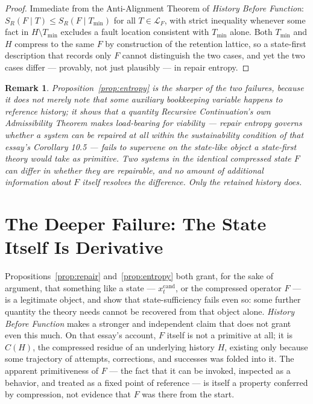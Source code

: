 \documentclass[11pt]{article}
\newtheorem*{remark}{Remark}
\begin{document}
\begin{proof}
Immediate from the Anti-Alignment Theorem of \emph{History Before Function}: $S_R(F\mid T)\leq S_R(F\mid T_{\min})$ for all $T\in\mathcal{L}_F$, with strict inequality whenever some fact in $H\setminus T_{\min}$ excludes a fault location consistent with $T_{\min}$ alone. Both $T_{\min}$ and $H$ compress to the same $F$ by construction of the retention lattice, so a state-first description that records only $F$ cannot distinguish the two cases, and yet the two cases differ — provably, not just plausibly — in repair entropy.
\end{proof}

\begin{remark}
Proposition~\ref{prop:entropy} is the sharper of the two failures, because it does not merely note that some auxiliary bookkeeping variable happens to reference history; it shows that a quantity \emph{Recursive Continuation}'s own Admissibility Theorem makes load-bearing for viability — repair entropy governs whether a system can be repaired at all within the sustainability condition of that essay's Corollary 10.5 — fails to supervene on the state-like object a state-first theory would take as primitive. Two systems in the identical compressed state $F$ can differ in whether they are repairable, and no amount of additional information about $F$ itself resolves the difference. Only the retained history does.
\end{remark}

\section{The Deeper Failure: The State Itself Is Derivative}

Propositions~\ref{prop:repair} and~\ref{prop:entropy} both grant, for the sake of argument, that something like a state — $x_t^{\mathrm{cand}}$, or the compressed operator $F$ — is a legitimate object, and show that state-sufficiency fails even so: some further quantity the theory needs cannot be recovered from that object alone. \emph{History Before Function} makes a stronger and independent claim that does not grant even this much. On that essay's account, $F$ itself is not a primitive at all; it is $C(H)$, the compressed residue of an underlying history $H$, existing only because some trajectory of attempts, corrections, and successes was folded into it. The apparent primitiveness of $F$ — the fact that it can be invoked, inspected as a behavior, and treated as a fixed point of reference — is itself a property conferred by compression, not evidence that $F$ was there from the start.
\end{document}
